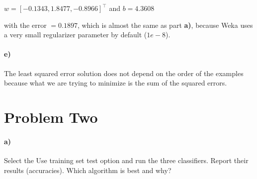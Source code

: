 \documentclass{article}
\begin{document}
\begin{center}
$w = [ -0.1343, 1.8477, -0.8966]^\top$ and $b = 4.3608$ 
\end{center}
with the error $= 0.1897$, which is almost the same as part \textbf{a)}, because Weka uses a very small regularizer parameter by default ($1e-8$).

\paragraph{e)} The least squared error solution does not depend on the order of the examples because what we are trying to minimize is the sum of the squared errors.

\section{Problem Two}
\paragraph{a)}
Select the Use training set test option and run the three classifiers. Report their results (accuracies). Which algorithm is best and why?
\end{document}

